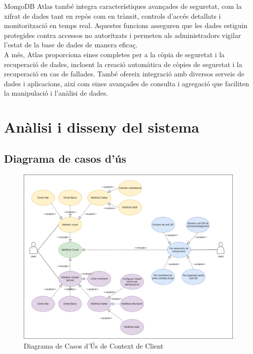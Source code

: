 \documentclass[a4paper,12pt,twoside]{ThesisStyle}
\begin{document}
MongoDB Atlas també integra característiques avançades de seguretat, com la xifrat de dades tant en repòs com en trànsit, controls d'accés detallats i monitorització en temps real. Aquestes funcions asseguren que les dades estiguin protegides contra accessos no autoritzats i permeten als administradors vigilar l'estat de la base de dades de manera eficaç.\\

A més, Atlas proporciona eines completes per a la còpia de seguretat i la recuperació de dades, incloent la creació automàtica de còpies de seguretat i la recuperació en cas de fallades. També ofereix integració amb diversos serveis de dades i aplicacions, així com eines avançades de consulta i agregació que faciliten la manipulació i l'anàlisi de dades.

\chapter{Anàlisi i disseny del sistema}
\label{chp:analisi}


\section{Diagrama de casos d'ús}
\label{sec: Diagrama de casos d'ús}

\begin{figure}[h]
    \centering
    \includegraphics[width=1\textwidth]{imatges/diagrama caso de uso client.png}
    \caption{ Diagrama de Casos d'Ús de Context de Client }
    \label{fig:Diagrama de Casos d'Ús de Context de Client}
\end{figure}
\end{document}
